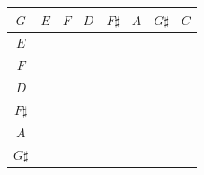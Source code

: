 \documentclass[12pt,noauthor,nooutcomes,hints,instructornotes]{ximera}%
\begin{document}
\begin{question}
\begin{enumerate}
\begin{center}
    \renewcommand{\arraystretch}{2}
\begin{tabular}{|c|c|c|c|c|c|c|c|}\hline
$G$ & $E$ & $F$ & $D$ & $F\sharp$ & $A$ & $G\sharp$ & $C$\\\hline
$E$ & \hspace{20 pt} & \hspace{20 pt} & \hspace{20 pt} & \hspace{20 pt} & \hspace{20 pt} & \hspace{20 pt} & \hspace{20 pt} \\\hline
$F$ & \hspace{20 pt} & \hspace{20 pt} & \hspace{20 pt} & \hspace{20 pt} & \hspace{20 pt} & \hspace{20 pt} & \hspace{20 pt} \\\hline
$D$ & \hspace{20 pt} & \hspace{20 pt} & \hspace{20 pt} & \hspace{20 pt} & \hspace{20 pt} & \hspace{20 pt} & \hspace{20 pt} \\\hline
$F\sharp$ & \hspace{20 pt} & \hspace{20 pt} & \hspace{20 pt} & \hspace{20 pt} & \hspace{20 pt} & \hspace{20 pt} & \hspace{20 pt} \\\hline
$A$ & \hspace{20 pt} & \hspace{20 pt} & \hspace{20 pt} & \hspace{20 pt} & \hspace{20 pt} & \hspace{20 pt} & \hspace{20 pt} \\\hline
$G\sharp$ & \hspace{20 pt} & \hspace{20 pt} & \hspace{20 pt} & \hspace{20 pt} & \hspace{20 pt} & \hspace{20 pt} & \hspace{20 pt} \\\hline

\end{tabular}
\end{center}
\end{enumerate}
\end{question}
\end{document}
